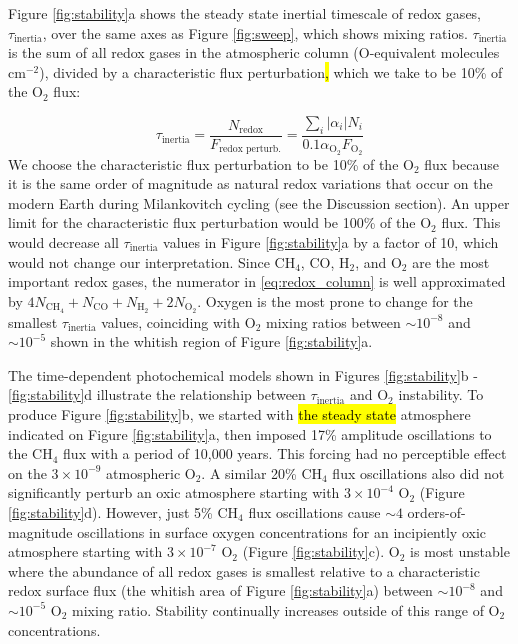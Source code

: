 \documentclass[9pt,twocolumn,twoside,lineno]{pnas-new}
\begin{document}
Figure \ref{fig:stability}a shows the steady state inertial timescale of redox gases, $\tau_\mathrm{inertia}$, over the same axes as Figure \ref{fig:sweep}, which shows mixing ratios. $\tau_\mathrm{inertia}$ is the sum of all redox gases in the atmospheric column (O-equivalent molecules cm$^{-2}$), divided by a characteristic flux perturbation\hl{,} which we take to be 10\% of the O$_2$ flux: 

\begin{equation} \label{eq:redox_column}
    \tau_\text{inertia} = \frac{N_\mathrm{redox}}{F_\text{redox perturb.}} = \frac{\sum_i | \alpha_i | N_i}{0.1 \alpha_\mathrm{O_2} F_\mathrm{O_2}}
\end{equation}
We choose the characteristic flux perturbation to be 10\% of the O$_2$ flux because it is the same order of magnitude as natural redox variations that occur on the modern Earth during Milankovitch cycling (see the Discussion section). An upper limit for the characteristic flux perturbation would be 100\% of the O$_2$ flux. This would decrease all $\tau_\mathrm{inertia}$ values in Figure \ref{fig:stability}a by a factor of 10, which would not change our interpretation. Since CH$_4$, CO, H$_2$, and O$_2$ are the most important redox gases, the numerator in \eqref{eq:redox_column} is well approximated by $4 N_\mathrm{CH_4} + N_\mathrm{CO} + N_\mathrm{H_2} + 2 N_\mathrm{O_2}$. Oxygen is the most prone to change for the smallest $\tau_\mathrm{inertia}$ values, coinciding with O$_2$ mixing ratios between $\sim10^{-8}$ and $\sim10^{-5}$ shown in the whitish region of Figure \ref{fig:stability}a.

The time-dependent photochemical models shown in Figures \ref{fig:stability}b - \ref{fig:stability}d illustrate the relationship between $\tau_\mathrm{inertia}$ and  O$_2$ instability. To produce Figure \ref{fig:stability}b, we started with \hl{the steady state} atmosphere indicated on Figure \ref{fig:stability}a, then imposed 17\% amplitude oscillations to the CH$_4$ flux with a period of 10,000 years. This forcing had no perceptible effect on the $3 \times 10^{-9}$ atmospheric O$_2$. A similar 20\% CH$_4$ flux oscillations also did not significantly perturb an oxic atmosphere starting with $3 \times 10^{-4}$ O$_2$ (Figure \ref{fig:stability}d). However, just 5\% CH$_4$ flux oscillations cause $\sim4$ orders-of-magnitude oscillations in surface oxygen concentrations for an incipiently oxic atmosphere starting with $3 \times 10^{-7}$ O$_2$ (Figure \ref{fig:stability}c). O$_2$ is most unstable where the abundance of all redox gases is smallest relative to a characteristic redox surface flux (the whitish area of Figure \ref{fig:stability}a) between $\sim10^{-8}$ and $\sim10^{-5}$ O$_2$ mixing ratio. Stability continually increases outside of this range of O$_2$ concentrations.
\end{document}
